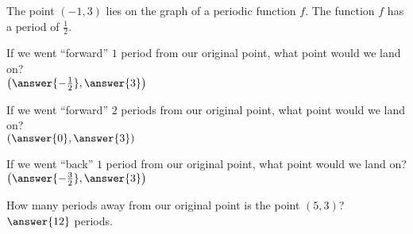 \documentclass{ximera}
\author{David Kish}
\begin{document}
The point $(-1, 3)$ lies on the graph of a periodic function $f$. The function $f$ has a period of $\frac{1}{2}$.\\
\begin{exercise}
If we went ``forward'' $1$ period from our original point, what point would we land on?\\
$\left(\answer{-\frac{1}{2}},\answer{3}\right)$\\
\end{exercise}
\begin{exercise}
If we went ``forward'' $2$ periods from our original point, what point would we land on?\\
$\left(\answer{0},\answer{3}\right)$\\
\end{exercise}
\begin{exercise}
If we went ``back'' $1$ period from our original point, what point would we land on?\\
$\left(\answer{-\frac{3}{2}},\answer{3}\right)$\\
\end{exercise}
\begin{exercise}
How many periods away from our original point is the point $(5, 3)$?\\
$\answer{12}$ periods.
\end{exercise}
\end{document}
